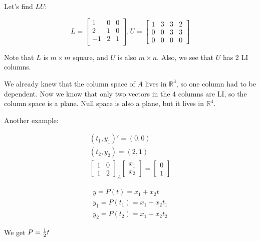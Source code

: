 \documentclass[12pt]{article}
\newcommand{\bbR}{\mathds{R}}
\newcommand{\<}{\langle}
\renewcommand{\>}{\rangle}
\begin{document}
Let's find $LU$:

\[
	L = \begin{bmatrix}
		1 & 0 & 0\\
		2 & 1 & 0\\
		-1 & 2 & 1 \\
	\end{bmatrix},
	U = \begin{bmatrix}
		1 & 3 & 3 & 2 \\
		0 & 0 & 3 & 3 \\
		0 & 0 & 0 & 0
	\end{bmatrix}
\]

Note that $L$ is $m \times m$ square, and $U$ is also $m \times n$. Also, we see that $U$ has 2 LI columns.

We already knew that the column space of $A$ lives in $\bbR^3$, so one column had to be dependent. Now we know that only two vectors in the 4 columns are LI, so the column space is a plane. Null space is also a plane, but it lives in $\bbR^4$.

Another example:

\[
	\begin{matrix}
		(t_1, y_1)' = (0,0) \\
		(t_2, y_2) = (2,1)\\
		\begin{bmatrix}
			1 & 0 \\ 1 & 2
		\end{bmatrix}_A
		\begin{bmatrix}
			x_1 \\ x_2
		\end{bmatrix} = 
		\begin{bmatrix}
			0 \\ 1
		\end{bmatrix}
	\end{matrix}
\]

\[
	\begin{matrix}
		y = P(t) = x_1 + x_2 t \\
		y_1 = P(t_1) = x_1 + x_2 t_1 \\
		y_2 = P(t_2) = x_1 + x_2 t_2
	\end{matrix}
\]

We get $P = {1 \over 2 } t$
\end{document}

